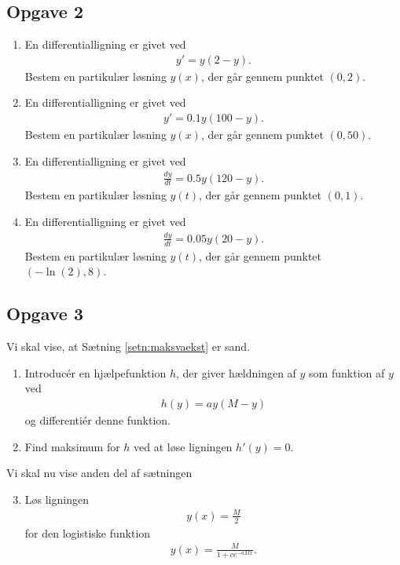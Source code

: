 \subsection*{Opgave 2}
\begin{enumerate}[label=\roman*)]
	\item En differentialligning er givet ved
	\begin{align*}
		y' = y(2-y).
	\end{align*}
	Bestem en partikulær løsning $y(x)$, der går gennem punktet $(0,2)$. 
	\item En differentialligning er givet ved
	\begin{align*}
		y' = 0.1y(100-y).
	\end{align*}
	Bestem en partikulær løsning $y(x)$, der går gennem punktet $(0,50)$. 
	\item En differentialligning er givet ved
	\begin{align*}
		\frac{dy}{dt} = 0.5y(120-y).
	\end{align*}
	Bestem en partikulær løsning $y(t)$, der går gennem punktet $(0,1)$. 
	\item En differentialligning er givet ved
	\begin{align*}
		\frac{dy}{dt} = 0.05y(20-y).
	\end{align*}
	Bestem en partikulær løsning $y(t)$, der går gennem punktet $(-\ln(2),8)$. 
\end{enumerate}
\subsection*{Opgave 3}
Vi skal vise, at Sætning \ref{setn:maksvaekst} er sand. 
\begin{enumerate}[label = \roman*)]
	\item Introducér en hjælpefunktion $h$, der giver hældningen af $y$ som funktion af $y$ ved
	\begin{align*}
		h(y) = ay(M-y)
	\end{align*}
	og differentiér denne funktion. 
	\item Find maksimum for $h$ ved at løse ligningen
	 $h'(y)=0$.
\end{enumerate}
Vi skal nu vise anden del af sætningen
\begin{enumerate}[label=\roman*)]
	\setcounter{enumi}{2}
	\item Løs ligningen 
	\begin{align*}
		y(x) = \frac{M}{2}
	\end{align*}
	for den logistiske funktion
	\begin{align*}
		y(x) = \frac{M}{1 + ce^{-aMx}}.
	\end{align*}
\end{enumerate}

